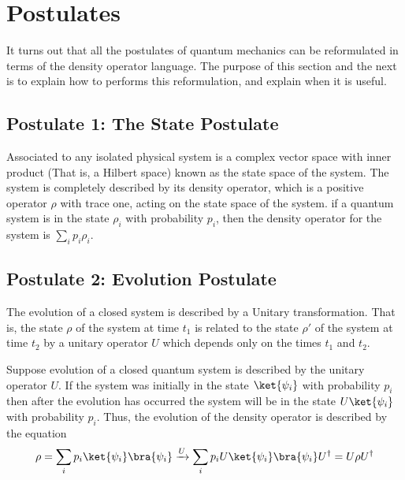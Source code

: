\documentclass[12pt, oneside]{book}
\theoremstyle{definition}
\theoremstyle{definition}
\theoremstyle{remark}
\begin{document}
\section{Postulates}
It turns out that all the postulates of quantum mechanics can be reformulated in terms of the density operator language. The purpose of this section and the next is to explain how to performs this reformulation, and explain when it is useful.
\subsection{Postulate 1: The State Postulate}
Associated to any isolated physical system is a complex vector space with inner product (That is, a Hilbert space) known as the state space of the system. The system is completely described by its density operator, which is a positive operator $\rho$ with trace one, acting on the state space of the system. if a quantum system is in the state $\rho_i$ with probability $p_i$, then the density operator for the system is $\sum_i p_i\rho_i$.

\subsection{Postulate 2: Evolution Postulate}
The evolution of a closed system is described by a Unitary transformation. That is, the state $\rho$ of the system at time $t_1$ is related to the state $\rho'$ of the system at time $t_2$ by a unitary operator $U$ which depends only on the times $t_1$ and $t_2$.

Suppose evolution of a closed quantum system is described by the unitary operator $U$. If the system was initially in the state $\ket{\psi_i}$ with probability $p_i$ then after the evolution has occurred the system will be in the state $U\ket{\psi_i}$ with probability $p_i$. Thus, the evolution of the density operator is described by the equation
\[
\rho=\sum_ip_i\ket{\psi_i}\bra{\psi_i} \xrightarrow{U} \sum_i p_iU\ket{\psi_i}\bra{\psi_i}U^{\dagger}=U\rho U^{\dagger}
\]
\end{document}
